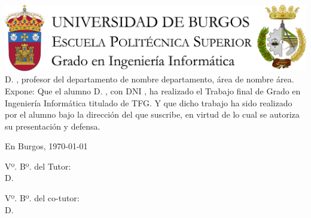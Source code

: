 \documentclass[a4paper,12pt,twoside]{memoir}
\begin{document}
\portada

\newpage\null\thispagestyle{empty}

\newpage\thispagestyle{empty}
\noindent\includegraphics[width=\textwidth]{../assets/cabecera}\vspace{1cm}
\noindent D. \tutor, profesor del departamento de nombre departamento, área de nombre área.
\noindent Expone:
\noindent Que el alumno D. \autor, con DNI \dni, ha realizado el Trabajo final de Grado en Ingeniería Informática titulado \titulo \space de TFG. 
\noindent Y que dicho trabajo ha sido realizado por el alumno bajo la dirección del que suscribe, en virtud de lo cual se autoriza su presentación y defensa.
\begin{center}
    En Burgos, {\large \today}
\end{center}
\vfill\vfill\vfill
\begin{minipage}{0.45\textwidth}
\begin{flushleft}
    Vº. Bº. del Tutor:\\[2cm]
    D. \tutor
\end{flushleft}
\end{minipage}
\hfill
\begin{minipage}{0.45\textwidth}
\begin{flushleft}
    Vº. Bº. del co-tutor:\\[2cm]
    D. \cotutor
\end{flushleft}
\end{minipage}
\hfill
\vfill

\newpage\null\thispagestyle{empty}
\end{document}
